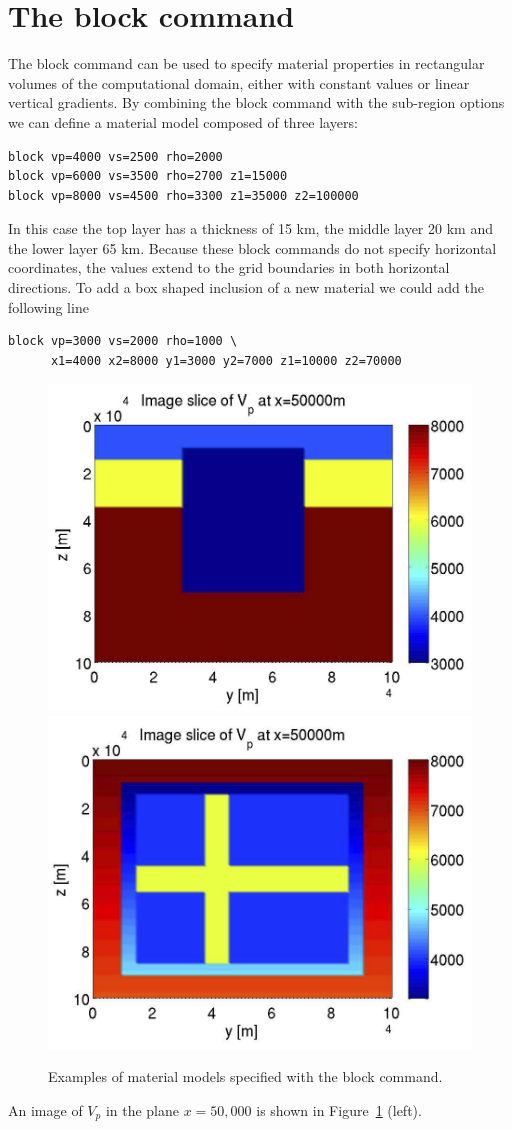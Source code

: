\documentclass[11pt]{report}
\begin{document}
\section{The block command}\label{sec:block}
The block command can be used to specify material properties in rectangular volumes of the
computational domain, either with constant values or linear vertical gradients. By combining the
block command with the sub-region options we can define a material model composed of three layers:
\begin{verbatim}
block vp=4000 vs=2500 rho=2000 
block vp=6000 vs=3500 rho=2700 z1=15000
block vp=8000 vs=4500 rho=3300 z1=35000 z2=100000
\end{verbatim}
In this case the top layer has a thickness of 15 km, the middle layer 20 km and the lower layer 65 km. Because
these block commands do not specify horizontal coordinates, the values extend to the grid boundaries in
both horizontal directions.  To add a box shaped inclusion of a new material we could add the following line
\begin{verbatim}
block vp=3000 vs=2000 rho=1000 \ 
      x1=4000 x2=8000 y1=3000 y2=7000 z1=10000 z2=70000
\end{verbatim}
\begin{figure}[ht]
\begin{centering}
  \includegraphics[width=0.45\linewidth]{blockVpimage.png}
  \includegraphics[width=0.45\linewidth]{flag.png}
  \caption{Examples of material models specified with the block command.}
  \label{fig:blockpics}
\end{centering}
\end{figure}
An image of $V_p$ in the plane $x=50,000$ is shown in Figure~\ref{fig:blockpics} (left).
\end{document}

